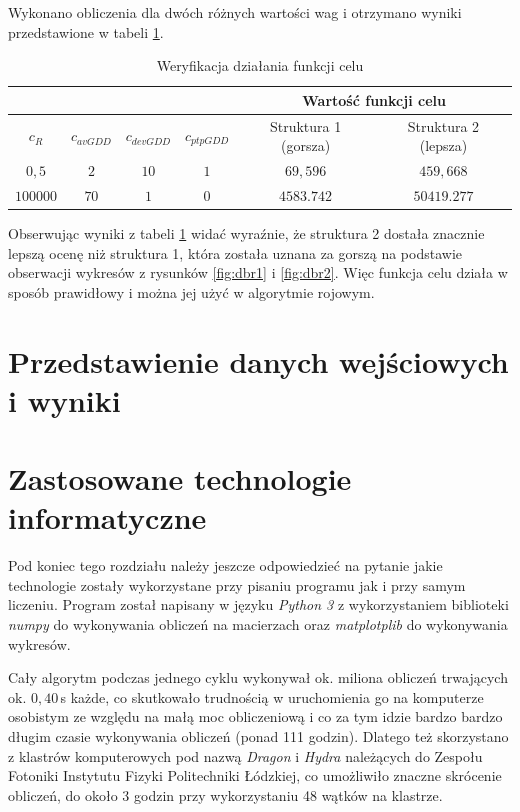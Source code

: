 Wykonano obliczenia dla dwóch różnych wartości wag i otrzymano wyniki przedstawione w tabeli \ref{tab:funkcel}.

\begin{table}[H]
    \centering
    \caption{Weryfikacja działania funkcji celu}
    \begin{tabular}{|c|c|c|c|c|c|} \cline{5-6}
        \multicolumn{4}{c}{} & \multicolumn{2}{|c|}{Wartość funkcji celu} \\\hline
         $c_R$ & $c_{avGDD}$& $c_{devGDD}$& $c_{ptpGDD}$ &  Struktura 1 (gorsza) & Struktura 2 (lepsza)\\\hline
         $0,5$ &$2$ &$10$& $1$& $69,596$ &$459,668$ \\\hline
         $100000$ & $70$& $1$& $0$& $4583.742$ & $50419.277$ \\\hline
    \end{tabular}
    \label{tab:funkcel}
\end{table}

Obserwując wyniki z tabeli \ref{tab:funkcel} widać wyraźnie, że struktura 2 dostała znacznie lepszą ocenę niż struktura 1, która została uznana za gorszą na podstawie obserwacji wykresów z rysunków \ref{fig:dbr1} i \ref{fig:dbr2}. Więc funkcja celu działa w sposób prawidłowy i można jej użyć w algorytmie rojowym. 

\section{Przedstawienie danych wejściowych i wyniki}


\section{Zastosowane technologie informatyczne}

Pod koniec tego rozdziału należy jeszcze odpowiedzieć na pytanie jakie technologie zostały wykorzystane przy pisaniu programu jak i przy samym liczeniu. 
Program został napisany w języku \textit{Python 3} z wykorzystaniem biblioteki \textit{numpy} do wykonywania obliczeń na macierzach oraz \textit{matplotplib} do wykonywania wykresów.

Cały algorytm podczas jednego cyklu wykonywał ok. miliona obliczeń trwających ok. $0,40\,$s każde, co skutkowało trudnością w uruchomienia go na komputerze osobistym ze względu na małą moc obliczeniową i co za tym idzie bardzo bardzo długim czasie wykonywania obliczeń (ponad 111 godzin). Dlatego też skorzystano z klastrów komputerowych pod nazwą \textit{Dragon} i \textit{Hydra} należących do Zespołu Fotoniki Instytutu Fizyki Politechniki Łódzkiej, co umożliwiło znaczne skrócenie obliczeń, do około 3 godzin przy wykorzystaniu 48 wątków na klastrze.

